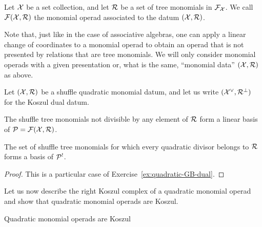 \begin{definition}
Let $\mathcal{X}$ be a set collection, and let $\mathcal{R}$ be a set of tree monomials
in $\mathcal{F}_{\mathcal{X}}$. We call $\mathcal{F}(\mathcal{X},\mathcal{R})$ the monomial operad associated to the
datum $(\mathcal{X},\mathcal{R})$. 
\end{definition}

Note that, just like in the case of associative algebras, one can apply
a linear change of coordinates to a monomial operad to obtain an operad
that is not presented by relations that are tree monomials. We will only
consider monomial operads with a given presentation or, what is the same,
``monomial data'' $(\mathcal{X},\mathcal{R})$ as above.

\begin{lemma}
Let $(\mathcal{X},\mathcal{R})$ be a shuffle quadratic monomial datum, and let us write
$(\mathcal{X}^\vee,\mathcal{R}^\perp)$ for the Koszul dual datum. 
\begin{tenumerate}
\item The shuffle tree monomials
not divisible by any element of $\mathcal{R}$ form a linear basis of
${\mathcal{P}} = \mathcal{F}(\mathcal{X},\mathcal{R})$.
\item  The set of shuffle tree monomials for which every
quadratic divisor belongs to $\mathcal{R}$ forms a basis of ${\mathcal{P}}^!$.
\end{tenumerate} 
\end{lemma}

\begin{proof}
This is a particular case of Exercise~\ref{ex:quadratic-GB-dual}.
\end{proof}

Let us now describe the right Koszul complex of a quadratic monomial operad
and show that quadratic monomial operads are Koszul.

\begin{theorem}
Quadratic monomial operads are Koszul
\end{theorem}

